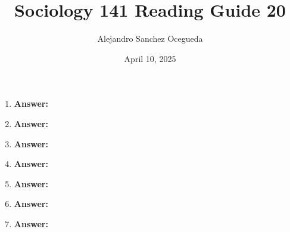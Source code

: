 \documentclass{article}
\title{Sociology 141 Reading Guide 20}
\author{Alejandro Sanchez Ocegueda}
\date{April 10, 2025}
\newcommand{\answer}{\textbf{Answer:}$\;$}
\begin{document}
\maketitle

\begin{enumerate}[label=\arabic*)]
    \item 
    
    \answer 
    
    \item 
    
    \answer 
    
    
    \item 
   

    \answer
    
    \item 
    
    \answer 
    
    \item 
    
    \answer
    

    \item 
    
    \answer
    
    \item 
    
    \answer
    
\end{enumerate}
 
\end{document}
